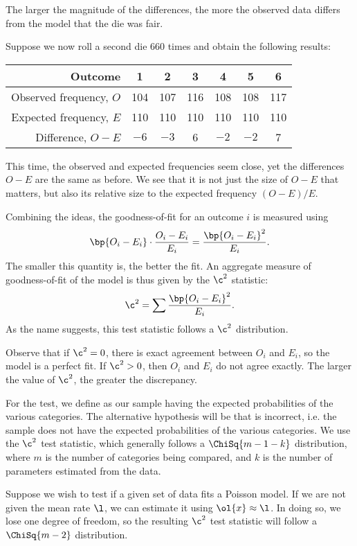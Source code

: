 The larger the magnitude of the differences, the more the observed data differs from the model that the die was fair. 

Suppose we now roll a second die 660 times and obtain the following results:
\begin{table}[H]
    \centering
    \begin{tabular}{|r|c|c|c|c|c|c|}
    \hline
    Outcome & 1 & 2 & 3 & 4 & 5 & 6 \\ \hline
    Observed frequency, $O$ & 104 & 107 & 116 & 108 & 108 & 117 \\ \hline
    Expected frequency, $E$ & 110 & 110 & 110 & 110 & 110 & 110 \\ \hline
    Difference, $O-E$ & $-6$ & $-3$ & 6 & $-2$ & $-2$ & 7 \\ \hline
    \end{tabular}
\end{table}

This time, the observed and expected frequencies seem close, yet the differences $O-E$ are the same as before. We see that it is not just the size of $O-E$ that matters, but also its relative size to the expected frequency $(O-E)/E$.

Combining the ideas, the goodness-of-fit for an outcome $i$ is measured using \[\bp{O_i - E_i} \cdot \frac{O_i - E_i}{E_i} = \frac{\bp{O_i - E_i}^2}{E_i}.\] The smaller this quantity is, the better the fit. An aggregate measure of goodness-of-fit of the model is thus given by the $\c^2$ statistic: \[\c^2 = \sum \frac{\bp{O_i - E_i}^2}{E_i}.\] As the name suggests, this test statistic follows a $\c^2$ distribution.

Observe that if $\c^2 = 0$, there is exact agreement between $O_i$ and $E_i$, so the model is a perfect fit. If $\c^2 > 0$, then $O_i$ and $E_i$ do not agree exactly. The larger the value of $\c^2$, the greater the discrepancy.

For the test, we define \nullhyp{} as our sample having the expected probabilities of the various categories. The alternative hypothesis \althyp{} will be that \nullhyp{} is incorrect, i.e. the sample does not have the expected probabilities of the various categories. We use the $\c^2$ test statistic, which generally follows a $\ChiSq{m-1-k}$ distribution, where $m$ is the number of categories being compared, and $k$ is the number of parameters estimated from the data.

\begin{example}
    Suppose we wish to test if a given set of data fits a Poisson model. If we are not given the mean rate $\l$, we can estimate it using $\ol{x} \approx \l$. In doing so, we lose one degree of freedom, so the resulting $\c^2$ test statistic will follow a $\ChiSq{m-2}$ distribution.
\end{example}

